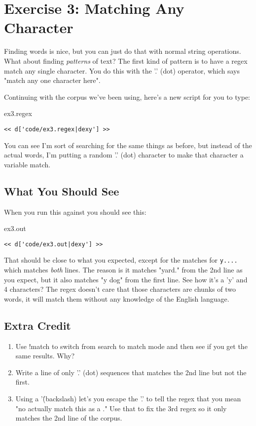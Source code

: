 \chapter{Exercise 3: Matching Any Character}

Finding words is nice, but you can just do that with normal
string operations.  What about finding \emph{patterns} of text?
The first kind of pattern is to have a regex match any single 
character.  You do this with the '.' (dot) operator, which
says "match any one character here".

Continuing with the corpus we've been using, here's
a new script for you to type:

\begin{code}{ex3.regex}
\begin{Verbatim}
<< d['code/ex3.regex|dexy'] >>
\end{Verbatim}
\end{code}

You can see I'm sort of searching for the same things as before, but instead
of the actual words, I'm putting a random '.' (dot) character to make that
character a variable match.

\section{What You Should See}

When you run this against  you should see this:

\begin{code}{ex3.out}
\begin{Verbatim}
<< d['code/ex3.out|dexy'] >>
\end{Verbatim}
\end{code}

That should be close to what you expected, except for the matches for
\verb|y....| which matches \emph{both} lines.  The reason is it matches
"yard." from the 2nd line as you expect, but it also matches "y dog"
from the first line.  See how it's a 'y' and 4 characters?  The regex
doesn't care that those characters are chunks of two words, it will match
them without any knowledge of the English language.


\section{Extra Credit}

\begin{enumerate}
\item Use !match to switch from search to match mode and then see if you
    get the same results.  Why?
\item Write a line of only '.' (dot) sequences that matches the 2nd line
    but not the first.
\item Using a '\' (backslash) let's you escape the '.' to tell the regex
    that you mean "no actually match this as a ."  Use that to fix the
    3rd regex so it only matches the 2nd line of the corpus.
\end{enumerate}

